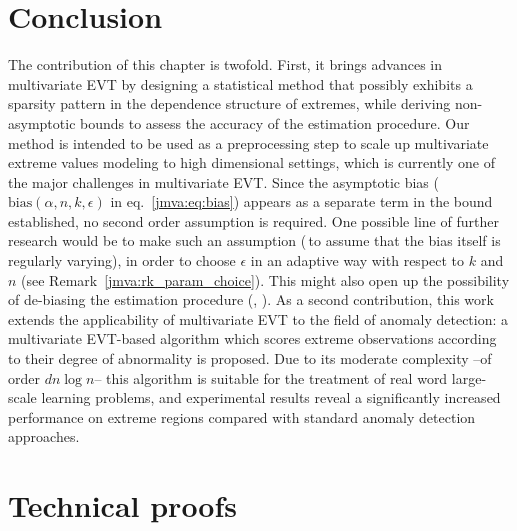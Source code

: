 \section{Conclusion}
The contribution of this chapter is twofold. First, it brings advances in multivariate EVT by designing a statistical method that possibly exhibits a sparsity pattern in the dependence structure of extremes, while deriving non-asymptotic bounds to assess the accuracy of the estimation procedure. Our method is intended to be used as a preprocessing step to scale up multivariate extreme values modeling to high dimensional settings, which is currently one of the major challenges in multivariate EVT.
Since the asymptotic bias ($\text{bias}(\alpha,n,k, \epsilon)$ in eq.~\eqref{jmva:eq:bias}) appears as a separate term  in the bound established, no second order
assumption is required. One possible line of further research would be to make  such an assumption (\ie\,to assume that the bias itself is regularly varying), in order to choose $\epsilon$ in an adaptive way with respect to $k$ and $n$ (see Remark~\ref{jmva:rk_param_choice}). This might also open up the possibility of de-biasing the estimation procedure (\cite{Fougeres2015}, \cite{Beirlant2015}). 
As a second contribution, this work extends the applicability of multivariate  EVT to the field of anomaly detection: a multivariate EVT-based algorithm which scores extreme observations according to their degree of abnormality is proposed. Due to its moderate complexity  --of order $d n \log n$--  this algorithm is suitable for the treatment of real word large-scale learning problems, and experimental results reveal a significantly increased performance on extreme regions compared with standard anomaly detection approaches.

 
\section{Technical proofs}
\label{jmva:appendix_proof}
